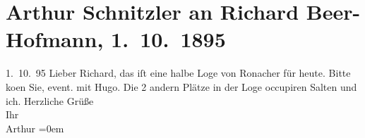 

         
         \renewcommand{\erwaehntePersonen}{Personen: Richard Beer-Hofmann, Hugo von Hofmannsthal, Felix Salten}
         \renewcommand{\erwaehnteOrte}{Orte: Etablissement Ronacher, Wien}
         \renewcommand{\erwaehnteWerke}{}
               \section[Arthur Schnitzler an Richard Beer-Hofmann, 1. 10. 1895]{ Arthur Schnitzler an Richard Beer-Hofmann, 1. 10. 1895}\nopagebreak{}\rehead{ }\begin{ledgroupsized}[t]{13cm}\normalsize\beginnumbering \toendnotes[C]{\smallbreak\pagebreak[2]} 
\pstart
           \raggedleft{}{\pb}1. 10. 95\pend
           \pstart{}Lieber Richard,\pend\pstart
           das iſt eine halbe Loge von Ronacher für heute. Bitte
                  ko{\geminationm}en Sie, event. {\pb}mit
                  Hugo.\pend
           \pstart
           Die 2 andern Plätze in der Loge occupiren Salten
               und ich.\pend
           \pstart
           {\pb}Herzliche Grüße{\\[\baselineskip]}Ihr{\\[\baselineskip]}\spacefill\mbox{Arthur}\pend
           \leftskip=0em{}
         
         \endnumbering{}\end{ledgroupsized}  \newcommand{\dateiname}{L00496}\newcommand{\titel}{Arthur Schnitzler an Richard Beer-Hofmann, 1. 10. 1895}\newcommand{\editorInnen}{Martin Anton Müller und Gerd-Hermann Susen}
      